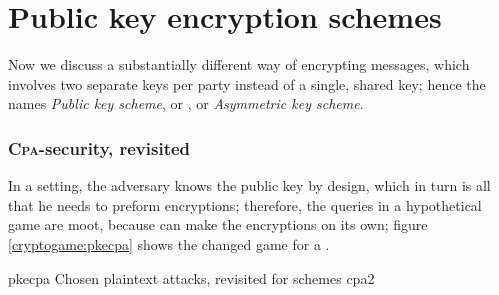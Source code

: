 \section{Public key encryption schemes}

Now we discuss a substantially different way of encrypting messages, which involves two separate keys per party instead of a single, shared key; hence the names \emph{Public key scheme}, or \pke{}, or \emph{Asymmetric key scheme}.


\subsubsection{\textsc{Cpa}-security, revisited}

In a \pke{} setting, the adversary knows the public key by design, which in turn is all that he needs to preform encryptions; therefore, the queries in a hypothetical \cpa{} game are moot, because \adversary{} can make the encryptions on its own; figure \ref{cryptogame:pkecpa} shows the changed game for a \pke{}.


\begin{cryptogame}
    {pkecpa}
    {Chosen plaintext attacks, revisited for \pke{} schemes}
    {cpa2}


    \cseqbeginloop
    \cseqendloop



    \cseqbeginloop
    \cseqendloop


\end{cryptogame}

